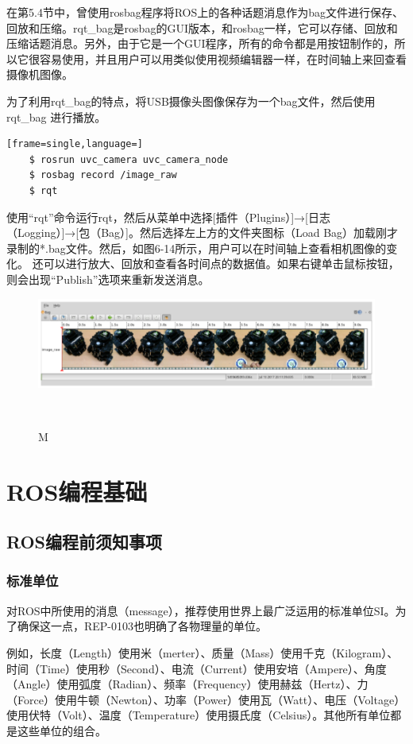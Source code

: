 \documentclass[geye,green,kindle,cn]{elegantnote}
\begin{document}
在第5.4节中，曾使用rosbag程序将ROS上的各种话题消息作为bag文件进行保存、回放和压缩。rqt\_bag是rosbag的GUI版本，和rosbag一样，它可以存储、回放和压缩话题消息。另外，由于它是一个GUI程序，所有的命令都是用按钮制作的，所以它很容易使用，并且用户可以用类似使用视频编辑器一样，在时间轴上来回查看摄像机图像。

为了利用rqt\_bag的特点，将USB摄像头图像保存为一个bag文件，然后使用rqt\_bag 进行播放。
\begin{lstlisting}[frame=single,language=]
    $ rosrun uvc_camera uvc_camera_node 
    $ rosbag record /image_raw 
    $ rqt 
\end{lstlisting}

使用“rqt”命令运行rqt，然后从菜单中选择[插件（Plugins）]→[日志 （Logging）]→[包（Bag）]。然后选择左上方的文件夹图标（Load Bag）加载刚才 录制的*.bag文件。然后，如图6-14所示，用户可以在时间轴上查看相机图像的变化。 还可以进行放大、回放和查看各时间点的数据值。如果右键单击鼠标按钮，则会出现“Publish”选项来重新发送消息。

\begin{figure}[htbp]
    \centering
    \includegraphics[width=1\linewidth]{src/M.png}
    \centering
    \caption{M} \label{picture:M}
\end{figure}
\section{ROS编程基础}
\subsection{ROS编程前须知事项}
\subsubsection{标准单位}
对ROS中所使用的消息（message），推荐使用世界上最广泛运用的标准单位SI。为了确保这一点，REP-0103也明确了各物理量的单位。

例如，长度（Length）使用米（merter）、质量（Mass）使用千克（Kilogram）、时间（Time）使用秒（Second）、电流（Current）使用安培（Ampere）、角度（Angle）使用弧度（Radian）、频率（Frequency）使用赫兹（Hertz）、力（Force）使用牛顿（Newton）、功率（Power）使用瓦（Watt）、电压（Voltage）使用伏特（Volt）、温度（Temperature）使用摄氏度（Celsius）。其他所有单位都是这些单位的组合。
\end{document}
